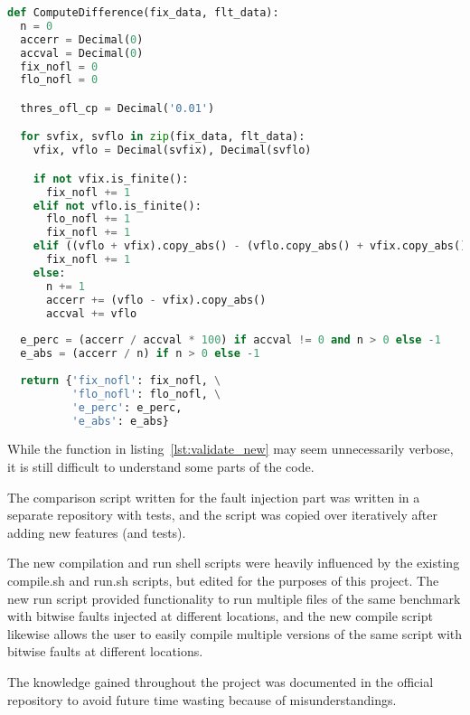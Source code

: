 \begin{lstlisting}[label=lst:validate_original,caption=Validate original,language=python]
def ComputeDifference(fix_data, flt_data):
  n = 0
  accerr = Decimal(0)
  accval = Decimal(0)
  fix_nofl = 0
  flo_nofl = 0

  thres_ofl_cp = Decimal('0.01')

  for svfix, svflo in zip(fix_data, flt_data):
    vfix, vflo = Decimal(svfix), Decimal(svflo)

    if not vfix.is_finite():
      fix_nofl += 1
    elif not vflo.is_finite():
      flo_nofl += 1
      fix_nofl += 1
    elif ((vflo + vfix).copy_abs() - (vflo.copy_abs() + vfix.copy_abs())) > thres_ofl_cp:
      fix_nofl += 1
    else:
      n += 1
      accerr += (vflo - vfix).copy_abs()
      accval += vflo
      
  e_perc = (accerr / accval * 100) if accval != 0 and n > 0 else -1
  e_abs = (accerr / n) if n > 0 else -1
      
  return {'fix_nofl': fix_nofl, \
          'flo_nofl': flo_nofl, \
          'e_perc': e_perc,
          'e_abs': e_abs}
\end{lstlisting}

While the function in listing~\ref{lst:validate_new} may seem unnecessarily verbose, it is still difficult to understand some parts of the code.

The comparison script written for the fault injection part was written in a separate repository with tests, and the script was copied over iteratively after adding new features (and tests).

The new compilation and run shell scripts were heavily influenced by the existing compile.sh and run.sh scripts, but edited for the purposes of this project. The new run script provided functionality to run multiple files of the same benchmark with bitwise faults injected at different locations, and the new compile script likewise allows the user to easily compile multiple versions of the same script with bitwise faults at different locations.


The knowledge gained throughout the project was documented in the official \taffo{} repository to avoid future time wasting because of misunderstandings. 